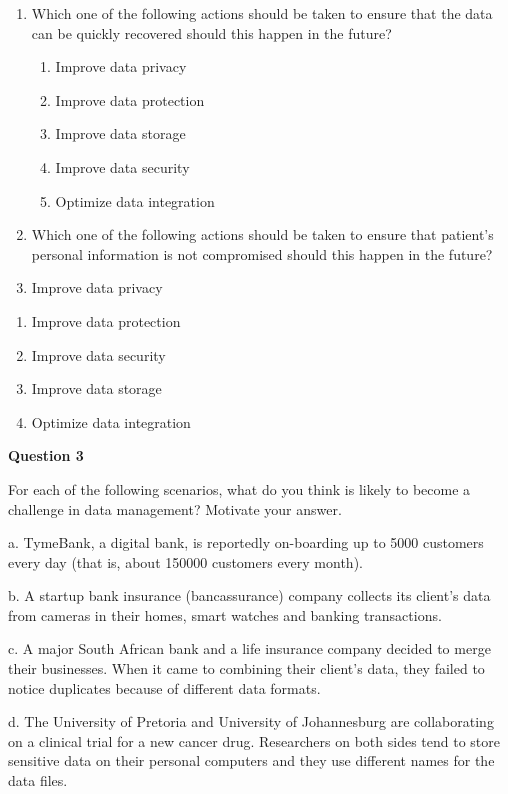\documentclass[
]{book}
\begin{document}
\begin{enumerate}
\def\labelenumi{\alph{enumi}.}
\item
  Which one of the following actions should be taken to ensure that the data can be quickly recovered should this happen in the future?

  \begin{enumerate}
  \def\labelenumii{\roman{enumii}.}
  \item
    Improve data privacy
  \item
    Improve data protection
  \item
    Improve data storage
  \item
    Improve data security
  \item
    Optimize data integration
  \end{enumerate}
\item
  Which one of the following actions should be taken to ensure that patient's personal information is not compromised should this happen in the future?
\item
  Improve data privacy
\end{enumerate}

\begin{enumerate}
\def\labelenumi{\roman{enumi}.}
\setcounter{enumi}{1}
\item
  Improve data protection
\item
  Improve data security
\item
  Improve data storage
\item
  Optimize data integration
\end{enumerate}

\textbf{Question 3}

For each of the following scenarios, what do you think is likely to become a challenge in data management? Motivate your answer.

a. TymeBank, a digital bank, is reportedly on-boarding up to 5000 customers every day (that is, about 150000 customers every month).

b. A startup bank insurance (bancassurance) company collects its client's data from cameras in their homes, smart watches and banking transactions.

c. A major South African bank and a life insurance company decided to merge their businesses. When it came to combining their client's data, they failed to notice duplicates because of different data formats.

d. The University of Pretoria and University of Johannesburg are collaborating on a clinical trial for a new cancer drug. Researchers on both sides tend to store sensitive data on their personal computers and they use different names for the data files.
\end{document}
